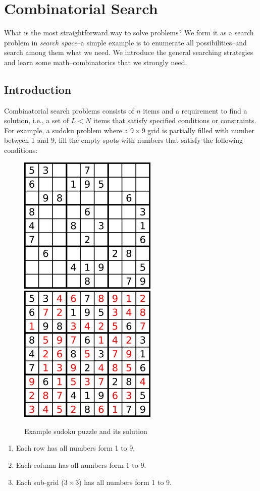 \documentclass[../main.tex]{subfiles}
\begin{document}
\chapter{Combinatorial Search}
What is the most straightforward way to solve problems? We form it as a search problem in \textit{search space}--a simple example is to enumerate all possibilities--and search among them what we need. We introduce the general searching strategies and learn some math--combinatorics that we strongly need. 
\section{Introduction}
Combinatorial search problems consists of $n$ items and a requirement to find a solution, i.e., a set of $L < N$ items that satisfy specified conditions or constraints. For example, a sudoku problem where a $9\times 9$ grid is partially filled with number between 1 and 9, fill the empty spots with numbers that satisfy the following conditions:
\begin{figure}[!ht]
    \centering
    \includegraphics[width= 0.35\columnwidth]{fig/250px-Sudoku-by-L2G-20050714.png}
    \includegraphics[width= 0.35\columnwidth]{fig/250px-Sudoku-by-L2G-20050714_solution.png}
    \caption{Example sudoku puzzle and its solution}
    \label{fig:backtrack_puzzle_1}
\end{figure}
\begin{enumerate}
    \item Each row has all numbers form 1 to 9.
    \item Each column has all numbers form 1 to 9.
    \item Each sub-grid ($3 \times3$) has all numbers form 1 to 9.
\end{enumerate}
\end{document}

